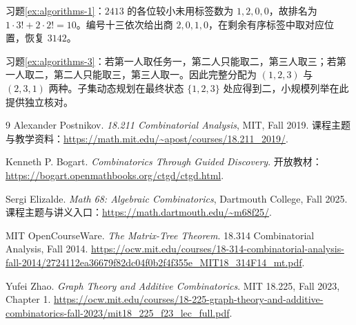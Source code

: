 \documentclass[UTF8,12pt,a4paper,fontset=fandol]{ctexbook}
\begin{document}
习题\ref{ex:algorithms-1}：$2413$ 的各位较小未用标签数为 $1,2,0,0$，故排名为 $1\cdot3!+2\cdot2!=10$。编号十三依次给出商 $2,0,1,0$，在剩余有序标签中取对应位置，恢复 $3142$。

习题\ref{ex:algorithms-3}：若第一人取任务一，第二人只能取二，第三人取三；若第一人取二，第二人只能取三，第三人取一。因此完整分配为 $(1,2,3)$ 与 $(2,3,1)$ 两种。子集动态规划在最终状态 $\{1,2,3\}$ 处应得到二，小规模列举在此提供独立核对。

\backmatter
\begin{thebibliography}{9}
Alexander Postnikov. \emph{18.211 Combinatorial Analysis}, MIT, Fall 2019. 课程主题与教学资料：\url{https://math.mit.edu/~apost/courses/18.211_2019/}.

Kenneth P. Bogart. \emph{Combinatorics Through Guided Discovery}. 开放教材：\url{https://bogart.openmathbooks.org/ctgd/ctgd.html}.

Sergi Elizalde. \emph{Math 68: Algebraic Combinatorics}, Dartmouth College, Fall 2025. 课程主题与讲义入口：\url{https://math.dartmouth.edu/~m68f25/}.

MIT OpenCourseWare. \emph{The Matrix-Tree Theorem}. 18.314 Combinatorial Analysis, Fall 2014. \url{https://ocw.mit.edu/courses/18-314-combinatorial-analysis-fall-2014/2724112ea36679f82dc04f0b2f4f355e_MIT18_314F14_mt.pdf}.

Yufei Zhao. \emph{Graph Theory and Additive Combinatorics}. MIT 18.225, Fall 2023, Chapter 1. \url{https://ocw.mit.edu/courses/18-225-graph-theory-and-additive-combinatorics-fall-2023/mit18_225_f23_lec_full.pdf}.

\end{thebibliography}
\end{document}
